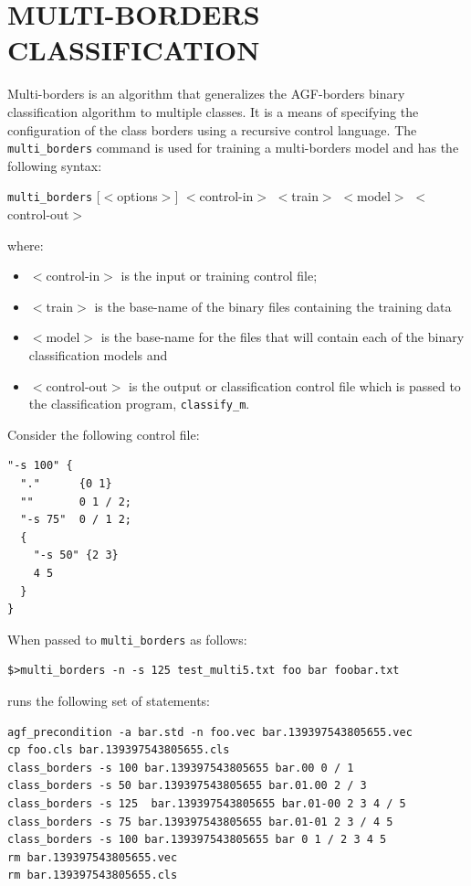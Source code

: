 \documentclass[12pt]{article}
\begin{document}
\section{MULTI-BORDERS CLASSIFICATION}

\label{MULTI_BORDERS_CLASSIFICATION}

  Multi-borders is an algorithm that generalizes the AGF-borders binary classification algorithm to multiple classes.  It is a means of specifying the configuration of the class borders using a recursive control language.  The \verb/multi_borders/ command is used for training a multi-borders model and has the following syntax:

  \verb/multi_borders/ [$<$options$>$] $<$control-in$>$ $<$train$>$ $<$model$>$ $<$control-out$>$

where:
\begin{itemize}
\item $<$control-in$>$ is the input or training control file; 
\item $<$train$>$ is the base-name of the binary files containing the training data
\item $<$model$>$ is the base-name for the files that will contain each of the binary classification models and 
\item $<$control-out$>$ is the output or classification control file which is passed to the classification program, \verb/classify_m/.
\end{itemize}

Consider the following control file:

\begin{verbatim}
"-s 100" {
  "."      {0 1}
  ""       0 1 / 2;
  "-s 75"  0 / 1 2;
  {
    "-s 50" {2 3}
    4 5
  } 
}
\end{verbatim}

When passed to \verb/multi_borders/ as follows:

\begin{verbatim}
$>multi_borders -n -s 125 test_multi5.txt foo bar foobar.txt
\end{verbatim}

runs the following set of statements:

\begin{verbatim}
agf_precondition -a bar.std -n foo.vec bar.139397543805655.vec
cp foo.cls bar.139397543805655.cls
class_borders -s 100 bar.139397543805655 bar.00 0 / 1
class_borders -s 50 bar.139397543805655 bar.01.00 2 / 3
class_borders -s 125  bar.139397543805655 bar.01-00 2 3 4 / 5
class_borders -s 75 bar.139397543805655 bar.01-01 2 3 / 4 5
class_borders -s 100 bar.139397543805655 bar 0 1 / 2 3 4 5
rm bar.139397543805655.vec
rm bar.139397543805655.cls
\end{verbatim}
\end{document}
